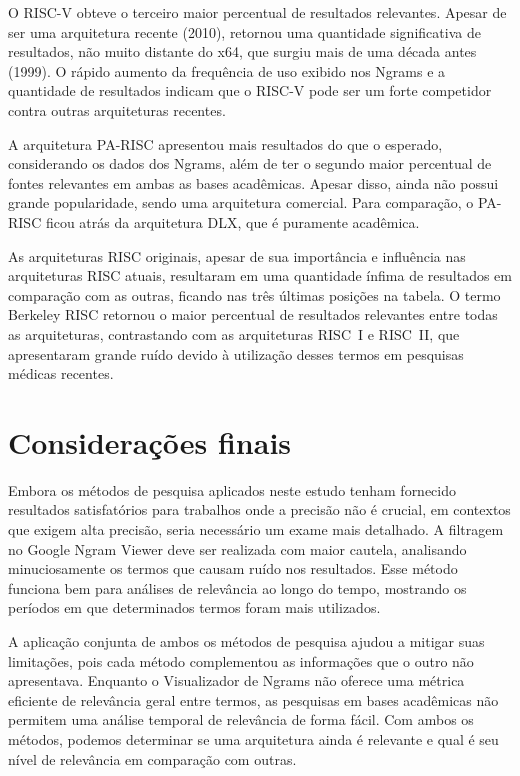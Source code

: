 \documentclass[
	article,			%
	11pt,				%
	oneside,			%
	a4paper,			%
	english,			%
	brazil,				%
	sumario=tradicional
	]{abntex2}
\begin{document}
O RISC-V obteve o terceiro maior percentual de resultados relevantes. Apesar de ser uma arquitetura recente (2010), retornou uma quantidade significativa de resultados, não muito distante do x64, que surgiu mais de uma década antes (1999). O rápido aumento da frequência de uso exibido nos Ngrams e a quantidade de resultados indicam que o RISC-V pode ser um forte competidor contra outras arquiteturas recentes.

A arquitetura PA-RISC apresentou mais resultados do que o esperado, considerando os dados dos Ngrams, além de ter o segundo maior percentual de fontes relevantes em ambas as bases acadêmicas. Apesar disso, ainda não possui grande popularidade, sendo uma arquitetura comercial. Para comparação, o PA-RISC ficou atrás da arquitetura DLX, que é puramente acadêmica.

As arquiteturas RISC originais, apesar de sua importância e influência nas arquiteturas RISC atuais, resultaram em uma quantidade ínfima de resultados em comparação com as outras, ficando nas três últimas posições na tabela. O termo Berkeley RISC retornou o maior percentual de resultados relevantes entre todas as arquiteturas, contrastando com as arquiteturas RISC~I e RISC~II, que apresentaram grande ruído devido à utilização desses termos em pesquisas médicas recentes.


% 

\clearpage
\section*{Considerações finais}

Embora os métodos de pesquisa aplicados neste estudo tenham fornecido resultados satisfatórios para trabalhos onde a precisão não é crucial, em contextos que exigem alta precisão, seria necessário um exame mais detalhado. A filtragem no Google Ngram Viewer deve ser realizada com maior cautela, analisando minuciosamente os termos que causam ruído nos resultados. Esse método funciona bem para análises de relevância ao longo do tempo, mostrando os períodos em que determinados termos foram mais utilizados.

A aplicação conjunta de ambos os métodos de pesquisa ajudou a mitigar suas limitações, pois cada método complementou as informações que o outro não apresentava. Enquanto o Visualizador de Ngrams não oferece uma métrica eficiente de relevância geral entre termos, as pesquisas em bases acadêmicas não permitem uma análise temporal de relevância de forma fácil. Com ambos os métodos, podemos determinar se uma arquitetura ainda é relevante e qual é seu nível de relevância em comparação com outras.
\end{document}
